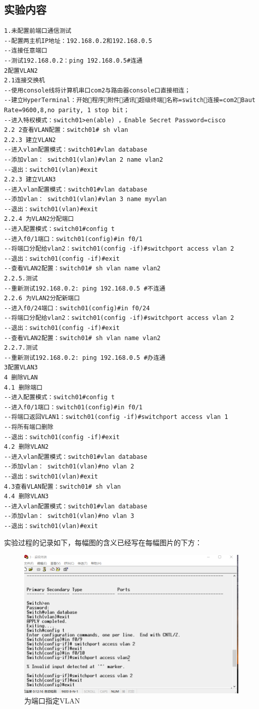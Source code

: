 \documentclass[lang=cn,11pt,a4paper,cite=authoryear]{elegantpaper}
\begin{document}
\subsection{实验内容}

\begin{lstlisting}
1.未配置前端口通信测试
--配置两主机IP地址：192.168.0.2和192.168.0.5
--连接任意端口
--测试192.168.0.2：ping 192.168.0.5#连通
2配置VLAN2
2.1连接交换机
--使用console线将计算机串口com2与路由器console口直接相连；
--建立HyperTerminal：开始程序附件通讯超级终端名称=switch连接=com2Baut Rate=9600,8,no parity, 1 stop bit；
--进入特权模式：switch01>en(able) ，Enable Secret Password=cisco
2.2 2查看VLAN配置：switch01# sh vlan
2.2.3 建立VLAN2
--进入vlan配置模式：switch01#vlan database
--添加vlan： switch01(vlan)#vlan 2 name vlan2 
--退出：switch01(vlan)#exit
2.2.3 建立VLAN3
--进入vlan配置模式：switch01#vlan database
--添加vlan： switch01(vlan)#vlan 3 name myvlan 
--退出：switch01(vlan)#exit
2.2.4 为VLAN2分配端口
--进入配置模式：switch01#config t
--进入f0/1端口：switch01(config)#in f0/1
--将端口分配给vlan2：switch01(config -if)#switchport access vlan 2
--退出：switch01(config -if)#exit
--查看VLAN2配置：switch01# sh vlan name vlan2
2.2.5.测试
--重新测试192.168.0.2: ping 192.168.0.5 #不连通
2.2.6 为VLAN2分配新端口
--进入f0/24端口：switch01(config)#in f0/24
--将端口分配给vlan2：switch01(config -if)#switchport access vlan 2
--退出：switch01(config -if)#exit
--查看VLAN2配置：switch01# sh vlan name vlan2
2.2.7.测试
--重新测试192.168.0.2: ping 192.168.0.5 #办连通
3配置VLAN3
4 删除VLAN
4.1 删除端口
--进入配置模式：switch01#config t
--进入f0/1端口：switch01(config)#in f0/1
--将端口返回VLAN1：switch01(config -if)#switchport access vlan 1
--将所有端口删除
--退出：switch01(config -if)#exit
4.2 删除VLAN2
--进入vlan配置模式：switch01#vlan database
--添加vlan： switch01(vlan)#no vlan 2
--退出：switch01(vlan)#exit
4.3查看VLAN配置：switch01# sh vlan
4.4 删除VLAN3
--进入vlan配置模式：switch01#vlan database
--添加vlan： switch01(vlan)#no vlan 3
--退出：switch01(vlan)#exit

\end{lstlisting}

实验过程的记录如下，每幅图的含义已经写在每幅图片的下方：


\begin{figure}[htbp]
	\centering
	\includegraphics[width=0.7\linewidth]{image/vlan1}
	\caption{为端口指定VLAN}
	\label{fig:vlan1}
\end{figure}
\end{document}
